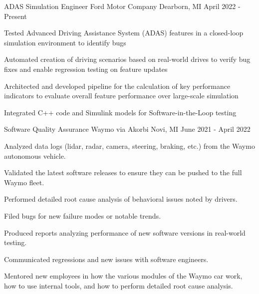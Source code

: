 
\begin{cventries}
  \cventry
    {ADAS Simulation Engineer}
    {Ford Motor Company}
    {Dearborn, MI}
    {April 2022 - Present}
    {
       \begin{cvitems}
            \item {Tested Advanced Driving Assistance System (ADAS) features in a closed-loop simulation environment to identify bugs}
            \item {Automated creation of driving scenarios based on real-world drives to verify bug fixes and enable regression testing on feature updates}
            \item {Architected and developed pipeline for the calculation of key performance indicators to evaluate overall feature performance over large-scale simulation}
            \item {Integrated C++ code and Simulink models for Software-in-the-Loop testing}
       \end{cvitems}
    }
  \cventry
    {Software Quality Assurance} %
    {Waymo via Akorbi} %
    {Novi, MI} %
    {June 2021 - April 2022} %
    {
      \begin{cvitems} %
        \item {Analyzed data logs (lidar, radar, camera, steering, braking, etc.) from the Waymo autonomous vehicle.}
        \item {Validated the latest software releases to ensure they can be pushed to the full Waymo fleet.}
        \item {Performed detailed root cause analysis of behavioral issues noted by drivers.}
        \item {Filed bugs for new failure modes or notable trends.}
        \item {Produced reports analyzing performance of new software versions in real-world testing.}
        \item {Communicated regressions and new issues with software engineers.}
        \item {Mentored new employees in how the various modules of the Waymo car work, how to use internal tools, and how to perform detailed root cause analysis.}
      \end{cvitems}
    }
\end{cventries}